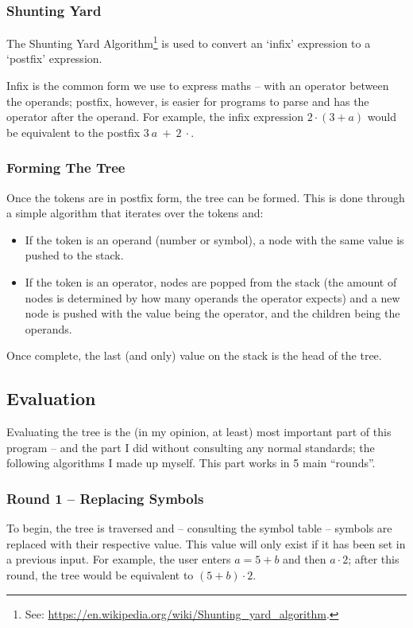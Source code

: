             \subsubsection*{Shunting Yard}
                The Shunting Yard Algorithm\footnote{See: \url{https://en.wikipedia.org/wiki/Shunting_yard_algorithm}.} is used to convert an `infix' expression to a `postfix' expression. 

                Infix is the common form we use to express maths -- with an operator between the operands; postfix, however, is easier for programs to parse and has the operator after the operand. For example, the infix expression $2 \cdot ( 3 + a )$ would be equivalent to the postfix $3~a~+~2~\cdot$.
            
            \subsubsection*{Forming The Tree}
                Once the tokens are in postfix form, the tree can be formed. This is done through a simple algorithm that iterates over the tokens and:
                \begin{itemize}
                    \item If the token is an operand (number or symbol), a node with the same value is pushed to the stack.
                    \item If the token is an operator, nodes are popped from the stack (the amount of nodes is determined by how many operands the operator expects) and a new node is pushed with the value being the operator, and the children being the operands.
                \end{itemize}

                \noindent Once complete, the last (and only) value on the stack is the head of the tree.
        
        \subsection{Evaluation}
            Evaluating the tree is the (in my opinion, at least) most important part of this program -- and the part I did without consulting any normal standards; the following algorithms I made up myself. This part works in 5 main ``rounds''.

            \subsubsection{Round 1 -- Replacing Symbols}
                To begin, the tree is traversed and -- consulting the symbol table -- symbols are replaced with their respective value. This value will only exist if it has been set in a previous input. For example, the user enters $a = 5 + b$ and then $a \cdot 2$; after this round, the tree would be equivalent to $(5 + b) \cdot 2$.

